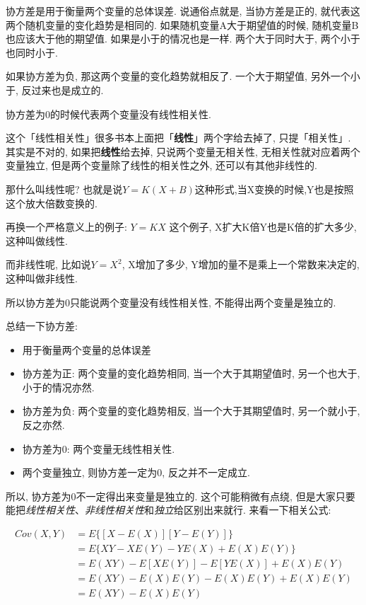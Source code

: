 协方差是用于衡量两个变量的总体误差. 说通俗点就是, 当协方差是正的, 就代表这两个随机变量的变化趋势是相同的. 如果随机变量A大于期望值的时候, 随机变量B也应该大于他的期望值. 如果是小于的情况也是一样. 两个大于同时大于, 两个小于也同时小于. 

如果协方差为负, 那这两个变量的变化趋势就相反了. 一个大于期望值, 另外一个小于, 反过来也是成立的. 

协方差为0的时候代表两个变量没有线性相关性. 

这个「线性相关性」很多书本上面把「\textbf{线性}」两个字给去掉了, 只提「相关性」. 其实是不对的, 如果把\textbf{线性}给去掉, 只说两个变量无相关性, 无相关性就对应着两个变量独立, 但是两个变量除了线性的相关性之外, 还可以有其他非线性的. 

那什么叫线性呢? 也就是说$Y=K(X+B)$这种形式,当X变换的时候,Y也是按照这个放大倍数变换的. 

再换一个严格意义上的例子: $Y=KX$ 这个例子, X扩大K倍Y也是K倍的扩大多少, 这种叫做线性. 

而非线性呢, 比如说$Y=X^2$, X增加了多少, Y增加的量不是乘上一个常数来决定的, 这种叫做非线性. 

所以协方差为0只能说两个变量没有线性相关性, 不能得出两个变量是独立的. 

总结一下协方差:

\begin{itemize}
  \item 用于衡量两个变量的总体误差
  \item 协方差为正: 两个变量的变化趋势相同, 当一个大于其期望值时, 另一个也大于, 小于的情况亦然.
  \item 协方差为负: 两个变量的变化趋势相反, 当一个大于其期望值时, 另一个就小于, 反之亦然.
  \item 协方差为0: 两个变量无线性相关性.
  \item 两个变量独立, 则协方差一定为0, 反之并不一定成立.
\end{itemize}

所以, 协方差为0不一定得出来变量是独立的. 这个可能稍微有点绕, 但是大家只要能把\textit{线性相关性}、\textit{非线性相关性}和\textit{独立}给区别出来就行. 来看一下相关公式:

\begin{align*}
  Cov(X,Y) & = E\{[X-E(X)][Y-E(Y)]\} \\
  & = E\{XY - XE(Y) - YE(X) + E(X)E(Y)\} \\
  & = E(XY) - E[XE(Y)] - E[YE(X)] + E(X)E(Y) \\
  & = E(XY) - E(X)E(Y) - E(X)E(Y) + E(X)E(Y) \\
  & = E(XY) - E(X)E(Y)
\end{align*}


